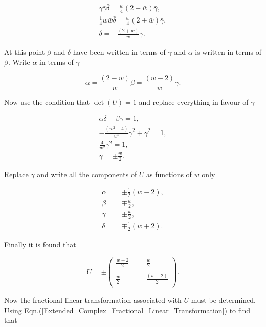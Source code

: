 \begin{appendix}
\begin{gather*}
\gamma \bar{\gamma} \bar{\delta} = \frac{w}{4}(2+\bar{w})\bar{\gamma},\\
\frac{1}{4}w\bar{w} \bar{\delta} = \frac{w}{4}(2+\bar{w})\bar{\gamma},\\
\delta = -\frac{(2 + w)}{w}\gamma.
\end{gather*}

\noindent At this point $\beta$ and $\delta$ have been written in terms of $\gamma$ and $\alpha$ is written in terms of $\beta$. Write $\alpha$ in terms of $\gamma$

\begin{equation*}
\alpha = \frac{(2-w)}{w}\beta = \frac{(w-2)}{w}\gamma.
\end{equation*}

\noindent Now use the condition that $\det{(U)} = 1$ and replace everything in favour of $\gamma$

\begin{gather*}
\alpha \delta - \beta \gamma = 1,\\
-\frac{(w^2 - 4)}{w^2}\gamma^2 + \gamma^2 = 1,\\
\frac{4}{w^2}\gamma^2 = 1,\\
\gamma = \pm \frac{w}{2}.
\end{gather*}

\noindent Replace $\gamma$ and write all the components of $U$ as functions of $w$ only

\begin{align*}
\alpha & = \pm \frac{1}{2}(w-2),\\
\beta & = \mp \frac{w}{2},\\
\gamma & = \pm \frac{w}{2},\\
\delta & = \mp \frac{1}{2}(w+2).
\end{align*}

\noindent Finally it is found that 

\begin{equation*}
U = \pm
\left(
\begin{array}{ccc}
\frac{w-2}{2} & & -\frac{w}{2}     \\
 & & \\
\frac{w}{2}   & & -\frac{(w+2)}{2} \\
\end{array}
\right).
\end{equation*}

Now the fractional linear transformation associated with $U$ must be determined. Using Eqn.(\ref{Extended_Complex_Fractional_Linear_Transformation}) to find that


\end{appendix}
